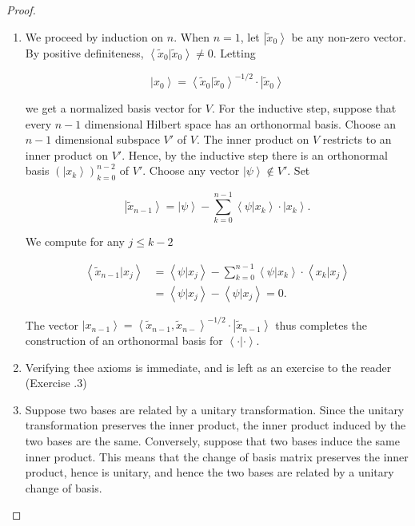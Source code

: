 \documentclass{article}
\theoremstyle{definition}
\numberwithin{figure}{section}
\begin{document}
\begin{proof}$\,$

\begin{enumerate}
\item We proceed by induction on $n$. When $n=1$, let $\left|\tilde{x}_0\right>$ be any non-zero vector.  By positive definiteness, $\left<\tilde{x}_0|\tilde{x}_0\right>\neq 0$. Letting

$$\left|x_0\right>=\left<\tilde{x}_0|\tilde{x}_0\right>^{-1/2}\cdot \left|\tilde{x}_0\right>$$

we get a normalized basis vector for $V$. For the inductive step, suppose that every $n-1$ dimensional Hilbert space has an orthonormal basis. Choose an $n-1$ dimensional subspace $V'$ of $V$. The inner product on $V$ restricts to an inner product on $V'$. Hence, by the inductive step there is an orthonormal basis $\left(\left|x_k\right>\right)_{k=0}^{n-2}$ of $V'$. Choose any vector $\left|\psi\right>\not\in V'$. Set

$$\left|\tilde{x}_{n-1}\right>=\left|\psi\right>-\sum_{k=0}^{n-1}\left<\psi|x_k\right>\cdot \left|x_k\right>.$$

We compute for any $j\leq k-2$

\begin{align*}
\left<\tilde{x}_{n-1}| x_j\right>&=\left<\psi | x_j\right>-\sum_{k=0}^{n-1}\left<\psi | x_k\right>\cdot \left< x_{k} | x_j\right>\\
&=\left<\psi | x_j\right>-\left<\psi | x_j\right>=0.
\end{align*}

The vector $\left|x_{n-1}\right>=\left<\tilde{x}_{n-1},\tilde{x}_{n-}\right>^{-1/2}\cdot \left|\tilde{x}_{n-1}\right>$ thus completes the construction of an orthonormal basis for $\left<\cdot | \cdot\right>$.

\item Verifying thee axioms is immediate, and is left as an exercise to the reader (Exercise \thesection.3)

\item Suppose two bases are related by a unitary transformation. Since the unitary transformation preserves the inner product, the inner product induced by the two bases are the same. Conversely, suppose that two bases induce the same inner product. This means that the change of basis matrix preserves the inner product, hence is unitary, and hence the two bases are related by a unitary change of basis. 
\end{enumerate}

\end{proof}
\end{document}
